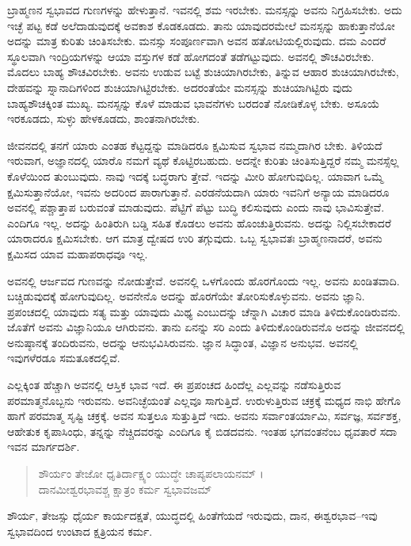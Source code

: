 ಬ್ರಾಹ್ಮಣನ ಸ್ವಭಾವದ ಗುಣಗಳನ್ನು ಹೇಳುತ್ತಾನೆ. ಇವನಲ್ಲಿ ಶಮ ಇರಬೇಕು. ಮನಸ್ಸನ್ನು ಅವನು ನಿಗ್ರಹಿಸಬೇಕು. ಅದು ಇಚ್ಛೆ ಪಟ್ಟ ಕಡೆ ಅಲೆದಾಡುವುದಕ್ಕೆ ಅವಕಾಶ ಕೊಡಕೂಡದು. ತಾನು ಯಾವುದರಮೇಲೆ ಮನಸ್ಸನ್ನು ಹಾಕುತ್ತಾನೆಯೋ ಅದನ್ನು ಮಾತ್ರ ಕುರಿತು ಚಿಂತಿಸಬೇಕು. ಮನಸ್ಸು ಸಂಪೂರ್ಣವಾಗಿ ಅವನ ಹತೋಟಿಯಲ್ಲಿರುವುದು. ದಮ ಎಂದರೆ ಸ್ಥೂಲವಾಗಿ ಇಂದ್ರಿಯಗಳನ್ನು ಆಯಾ ವಸ್ತುಗಳ ಕಡೆ ಹೋಗದಂತೆ ತಡೆಗಟ್ಟುವುದು. ಅವನಲ್ಲಿ ಶೌಚವಿರಬೇಕು. ಮೊದಲು ಬಾಹ್ಯ ಶೌಚವಿರಬೇಕು. ಅವನು ಉಡುವ ಬಟ್ಟೆ ಶುಚಿಯಾಗಿರಬೇಕು, ತಿನ್ನುವ ಆಹಾರ ಶುಚಿಯಾಗಿರಬೇಕು, ದೇಹವನ್ನು ಸ್ನಾನಾದಿಗಳಿಂದ ಶುಚಿಯಾಗಿಟ್ಟಿರಬೇಕು. ಅದರಂತೆಯೇ ಮನಸ್ಸನ್ನು ಶುಚಿಯಾಗಿಟ್ಟಿರು ವುದು ಬಾಹ್ಯಶೌಚಕ್ಕಿಂತ ಮುಖ್ಯ. ಮನಸ್ಸನ್ನು ಕೊಳೆ ಮಾಡುವ ಭಾವನೆಗಳು ಬರದಂತೆ ನೋಡಿಕೊಳ್ಳ ಬೇಕು. ಅಸೂಯೆ ಇರಕೂಡದು, ಸುಳ್ಳು ಹೇಳಕೂಡದು, ಶಾಂತನಾಗಿರಬೇಕು.

ಜೀವನದಲ್ಲಿ ತನಗೆ ಯಾರು ಎಂತಹ ಕೆಟ್ಟದ್ದನ್ನು ಮಾಡಿದರೂ ಕ್ಷಮಿಸುವ ಸ್ವಭಾವ ನಮ್ಮದಾಗಿರ ಬೇಕು. ತಿಳಿಯದೆ ಇರುವಾಗ, ಅಜ್ಞಾನದಲ್ಲಿ ಯಾರೊ ನಮಗೆ ವ್ಯಥೆ ಕೊಟ್ಟಿರಬಹುದು. ಅದನ್ನೇ ಕುರಿತು ಚಿಂತಿಸುತ್ತಿದ್ದರೆ ನಮ್ಮ ಮನಸ್ಸೆಲ್ಲ ಕೊಳೆಯಿಂದ ತುಂಬುವುದು. ನಾವು ಇದಕ್ಕೆ ಬದ್ಧರಾಗು ತ್ತೇವೆ. ಇದನ್ನು ಮೀರಿ ಹೋಗುವುದಿಲ್ಲ. ಯಾವಾಗ ಒಮ್ಮೆ ಕ್ಷಮಿಸುತ್ತಾನೆಯೋ, ಇವನು ಅದರಿಂದ ಪಾರಾಗುತ್ತಾನೆ. ಎರಡನೆಯದಾಗಿ ಯಾರು ಇವನಿಗೆ ಅನ್ಯಾಯ ಮಾಡಿದರೂ ಅವನಲ್ಲಿ ಪಶ್ಚಾತ್ತಾಪ ಬರುವಂತೆ ಮಾಡುವುದು. ಪೆಟ್ಟಿಗೆ ಪೆಟ್ಟು ಬುದ್ಧಿ ಕಲಿಸುವುದು ಎಂದು ನಾವು ಭಾವಿಸುತ್ತೇವೆ. ಎಂದಿಗೂ ಇಲ್ಲ. ಅದನ್ನು ಹಿಂತಿರುಗಿ ಬಡ್ಡಿ ಸಹಿತ ಕೊಡಲು ಅವನು ಹೊಂಚುತ್ತಿರುವನು. ಅದನ್ನು ನಿಲ್ಲಿಸಬೇಕಾದರೆ ಯಾರಾದರೂ ಕ್ಷಮಿಸಬೇಕು. ಆಗ ಮಾತ್ರ ದ್ವೇಷದ ಉರಿ ತಗ್ಗುವುದು. ಒಬ್ಬ ಸ್ವಭಾವತಃ ಬ್ರಾಹ್ಮಣನಾದರೆ, ಅವನು ಕ್ಷಮಿಸದ ಯಾವ ಮಹಾಪರಾಧವೂ ಇಲ್ಲ.

ಅವನಲ್ಲಿ ಆರ್ಜವದ ಗುಣವನ್ನು ನೋಡುತ್ತೇವೆ. ಅವನಲ್ಲಿ ಒಳಗೊಂದು ಹೊರಗೊಂದು ಇಲ್ಲ. ಅವನು ಖಂಡಿತವಾದಿ. ಬಚ್ಚಿಡುವುದಕ್ಕೆ ಹೋಗುವುದಿಲ್ಲ. ಅವನೇನೊ ಅದನ್ನು ಹೊರಗೆಯೇ ತೋರಿಸುಕೊಳ್ಳುವನು. ಅವನು ಜ್ಞಾನಿ. ಪ್ರಪಂಚದಲ್ಲಿ ಯಾವುದು ಸತ್ಯ ಮತ್ತು ಯಾವುದು ಮಿಥ್ಯ ಎಂಬುದನ್ನು ಚೆನ್ನಾಗಿ ವಿಚಾರ ಮಾಡಿ ತಿಳಿದುಕೊಂಡಿರುವನು. ಜೊತೆಗೆ ಅವನು ವಿಜ್ಞಾನಿಯೂ ಆಗಿರುವನು. ತಾನು ಏನನ್ನು ಸರಿ ಎಂದು ತಿಳಿದುಕೊಂಡಿರುವನೊ ಅದನ್ನು ಜೀವನದಲ್ಲಿ ಅನುಷ್ಠಾನಕ್ಕೆ ತಂದಿರುವನು, ಅದನ್ನು ಆನುಭವಿಸಿರುವನು. ಜ್ಞಾನ ಸಿದ್ಧಾಂತ, ವಿಜ್ಞಾನ ಅನುಭವ. ಅವನಲ್ಲಿ ಇವುಗಳೆರಡೂ ಸಮತೂಕದಲ್ಲಿವೆ.

ಎಲ್ಲಕ್ಕಿಂತ ಹೆಚ್ಚಾಗಿ ಅವನಲ್ಲಿ ಆಸ್ತಿಕ ಭಾವ ಇದೆ. ಈ ಪ್ರಪಂಚದ ಹಿಂದೆಲ್ಲ ಎಲ್ಲವನ್ನು ನಡೆಸುತ್ತಿರುವ ಪರಮಾತ್ಮನೊಬ್ಬನು ಇರುವನು. ಅವನಿಚ್ಛೆಯಂತೆ ಎಲ್ಲವೂ ಸಾಗುತ್ತಿದೆ. ಉರುಳುತ್ತಿರುವ ಚಕ್ರಕ್ಕೆ ಮಧ್ಯದ ನಾಭಿ ಹೇಗೊ ಹಾಗೆ ಪರಮಾತ್ಮ ಸೃಷ್ಟಿ ಚಕ್ರಕ್ಕೆ. ಅವನ ಸುತ್ತಲೂ ಸುತ್ತುತ್ತಿದೆ ಇದು. ಅವನು ಸರ್ವಾಂತರ್ಯಾಮಿ, ಸರ್ವಜ್ಞ, ಸರ್ವಶಕ್ತ, ಆಹೇತುಕ ಕೃಪಾಸಿಂಧು, ತನ್ನನ್ನು ನೆಚ್ಚಿದವರನ್ನು ಎಂದಿಗೂ ಕೈ ಬಿಡದವನು. ಇಂತಹ ಭಗವಂತನೆಂಬ ಧೃವತಾರೆ ಸದಾ ಇವನ ಮಾರ್ಗದರ್ಶಿ.

\begin{verse}
ಶೌರ್ಯಂ ತೇಜೋ ಧೃತಿರ್ದಾಕ್ಷ್ಯಂ ಯುದ್ಧೇ ಚಾಪ್ಯಪಲಾಯನಮ್ ।\\ದಾನಮೀಶ್ವರಭಾವಶ್ಚ ಕ್ಷಾತ್ರಂ ಕರ್ಮ ಸ್ವಭಾವಜಮ್ 
\end{verse}

{\small ಶೌರ್ಯ, ತೇಜಸ್ಸು ಧೈರ್ಯ ಕಾರ್ಯದಕ್ಷತೆ, ಯುದ್ಧದಲ್ಲಿ ಹಿಂತೆಗೆಯದೆ ಇರುವುದು, ದಾನ, ಈಶ್ವರಭಾವ–ಇವು ಸ್ವಭಾವದಿಂದ ಉಂಟಾದ ಕ್ಷತ್ರಿಯನ ಕರ್ಮ.}

